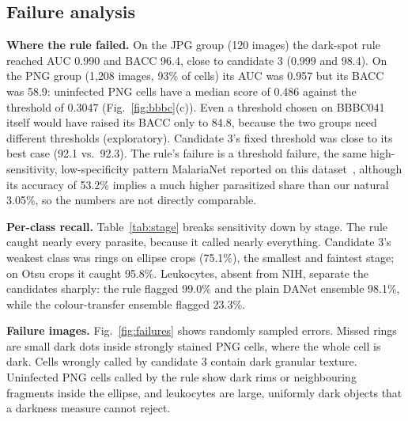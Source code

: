 \documentclass[conference]{IEEEtran}
\begin{document}
\subsection{Failure analysis}
\label{sec:fail}
\textbf{Where the rule failed.} On the JPG group (120 images) the dark-spot rule reached AUC 0.990 and BACC 96.4, close to candidate 3 (0.999 and 98.4). On the PNG group (1{,}208 images, 93\% of cells) its AUC was 0.957 but its BACC was 58.9: uninfected PNG cells have a median score of 0.486 against the threshold of 0.3047 (Fig.~\ref{fig:bbbc}(c)). Even a threshold chosen on BBBC041 itself would have raised its BACC only to 84.8, because the two groups need different thresholds (exploratory). Candidate 3's fixed threshold was close to its best case (92.1 vs.\ 92.3). The rule's failure is a threshold failure, the same high-sensitivity, low-specificity pattern MalariaNet reported on this dataset~\cite{hou2026malarianet}, although its accuracy of 53.2\% implies a much higher parasitized share than our natural 3.05\%, so the numbers are not directly comparable.

\textbf{Per-class recall.} Table~\ref{tab:stage} breaks sensitivity down by stage. The rule caught nearly every parasite, because it called nearly everything. Candidate 3's weakest class was rings on ellipse crops (75.1\%), the smallest and faintest stage; on Otsu crops it caught 95.8\%. Leukocytes, absent from NIH, separate the candidates sharply: the rule flagged 99.0\% and the plain DANet ensemble 98.1\%, while the colour-transfer ensemble flagged 23.3\%.

\textbf{Failure images.} Fig.~\ref{fig:failures} shows randomly sampled errors. Missed rings are small dark dots inside strongly stained PNG cells, where the whole cell is dark. Cells wrongly called by candidate 3 contain dark granular texture. Uninfected PNG cells called by the rule show dark rims or neighbouring fragments inside the ellipse, and leukocytes are large, uniformly dark objects that a darkness measure cannot reject.
\end{document}
